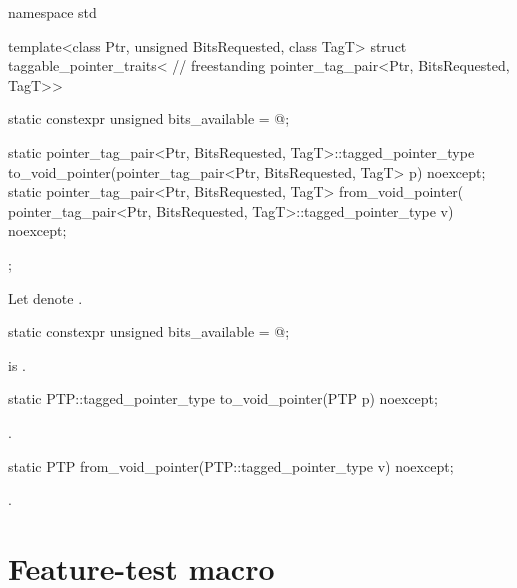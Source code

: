 \documentclass{wg21}
\begin{document}
\begin{addedblock}

%
\begin{codeblock}
namespace std {
  template<class Ptr, unsigned BitsRequested, class TagT>
  struct taggable_pointer_traits<                               // freestanding
    pointer_tag_pair<Ptr, BitsRequested, TagT>> {
    static constexpr unsigned bits_available = @\seebelow@;

    static pointer_tag_pair<Ptr, BitsRequested, TagT>::tagged_pointer_type
      to_void_pointer(pointer_tag_pair<Ptr, BitsRequested, TagT> p) noexcept;
    static pointer_tag_pair<Ptr, BitsRequested, TagT> from_void_pointer(
      pointer_tag_pair<Ptr, BitsRequested, TagT>::tagged_pointer_type v) noexcept;
  };
}
\end{codeblock}

\pnum
Let  denote .

\begin{itemdecl}
static constexpr unsigned bits_available = @\seebelow@;
\end{itemdecl}

\begin{itemdescr}
\pnum
{} is  .
\end{itemdescr}

\begin{itemdecl}
static PTP::tagged_pointer_type to_void_pointer(PTP p) noexcept;
\end{itemdecl}

\begin{itemdescr}
\pnum
\returns
{}.
\end{itemdescr}

\begin{itemdecl}
static PTP from_void_pointer(PTP::tagged_pointer_type v) noexcept;
\end{itemdecl}

\begin{itemdescr}
\pnum
\returns
{}.
\end{itemdescr}


\end{addedblock}

\section{Feature-test macro}
\end{document}
